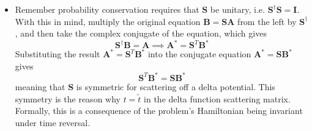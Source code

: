\documentclass[11pt, a4paper]{article}
\renewcommand{\vec}[1]{\bm{#1}} %
\newcommand{\mat}[1]{\mathbf{#1}} %
\begin{document}
\begin{itemize}
	\item Remember probability conservation requires that $ \mat{S} $ be unitary, i.e. $ \mat{S}^{\dagger}\mat{S} = \mat{I} $. With this in mind, multiply the original equation $ \vec{B} = \mat{S} \vec{A} $ from the left by $ \mat{S}^{\dagger} $, and then take the complex conjugate of the equation, which gives
	\begin{equation*}
		\mat{S}^{\dagger}\mat{B} = \mat{A} \implies \mat{A}^{*} = \mat{S}^{T} \mat{B}^{*}
	\end{equation*}
	Substituting the result $ \mat{A}^{*} = \mat{S}^{T} \mat{B}^{*} $ into the conjugate equation $ \vec{A}^{*} = \mat{S} \vec{B}^{*} $ gives
	\begin{equation*}
		\mat{S}^{T} \mat{B}^{*} = \mat{S} \vec{B}^{*}
	\end{equation*}
	meaning that $ \mat{S} $ is symmetric for scattering off a delta potential. This symmetry is the reason why $ t = \tilde{t} $ in the delta function scattering matrix. Formally, this is a consequence of the problem's Hamiltonian being invariant under time reversal. 


\end{itemize}
\end{document}
